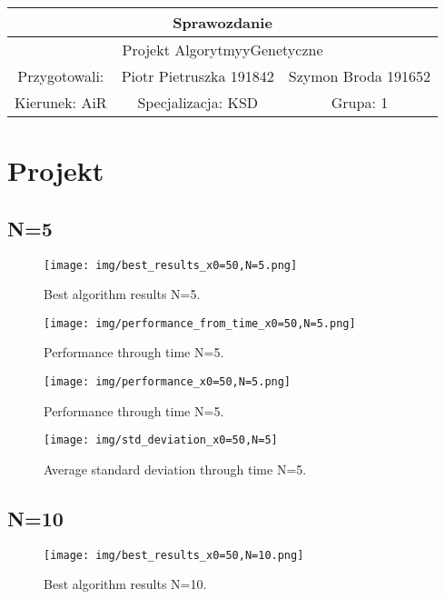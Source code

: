 \documentclass{article}
\begin{document}
\begin{tabular}{|c|c|c|}
\hline 
\multicolumn{3}{|c|}{\huge Sprawozdanie } \\ 
\hline 
\multicolumn{3}{|c|}{\LARGE Projekt AlgorytmyyGenetyczne} \\ 
\hline 
\Large Przygotowali: &\Large Piotr Pietruszka 191842 &\Large Szymon Broda 191652  \\ 
\hline 
\Large Kierunek: AiR&\Large Specjalizacja: KSD &\Large Grupa: 1 \\ 
\hline 
 
\end{tabular} 
\section{Projekt}

\subsection{N=5}
\begin{figure}[H]
\centering
\texttt{[image: img/best\_results\_x0=50,N=5.png]}
\caption{Best algorithm results N=5.}
\label{fig:label1}
\end{figure}

\begin{figure}[H]
\centering
\texttt{[image: img/performance\_from\_time\_x0=50,N=5.png]}
\caption{Performance through time N=5.}
\label{fig:label1}
\end{figure}

\begin{figure}[H]
\centering
\texttt{[image: img/performance\_x0=50,N=5.png]}
\caption{Performance through time N=5.}
\label{fig:label1}
\end{figure}

\begin{figure}[H]
\centering
\texttt{[image: img/std\_deviation\_x0=50,N=5]}
\caption{Average standard deviation through time N=5.}
\label{fig:label1}
\end{figure}


\subsection{N=10}
\begin{figure}[H]
\centering
\texttt{[image: img/best\_results\_x0=50,N=10.png]}
\caption{Best algorithm results N=10.}
\label{fig:label1}
\end{figure}
\end{document}
